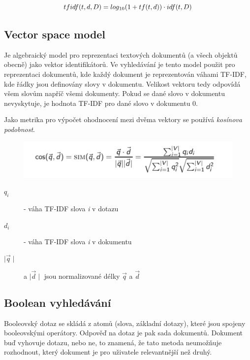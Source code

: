 \documentclass[12pt, a4paper]{article}
\begin{document}
\begin{equation}
tfidf(t,d,D) = log\textsubscript{10}(1 + tf(t,d)) \cdot idf(t,D)
\end{equation}

\subsection{Vector space model}
\noindent Je algebraický model pro reprezentaci textových dokumentů (a všech objektů obecně) jako vektor identifikátorů. Ve vyhledávání je tento model použit pro reprezentaci dokumentů, kde každý dokument je reprezentován váhami TF-IDF, kde řádky jsou definovány slovy v dokumentu. Velikost vektoru tedy odpovídá všem slovům napříč všemi dokumenty. Pokud se dané slovo v dokumentu nevyskytuje, je hodnota TF-IDF pro dané slovo v dokumentu 0.

Jako metrika pro výpočet ohodnocení mezi dvěma vektory se používá \textit{kosínova podobnost}.

\begin{figure}[H]
  \centering
  \includegraphics[scale=0.3]{img/cosine.png}
  \label{struktura}
\end{figure}

\begin{description}

	\item [$q_i$] - váha TF-IDF slova \textit{i} v dotazu
	\item [$d_i$] - váha TF-IDF slova \textit{i} v dokumentu
	\item [$\mid \overrightarrow{q} \mid$] a $\mid \overrightarrow{d} \mid$ jsou normalizované délky $\overrightarrow{q}$ a $\overrightarrow{d}$
\end{description}


\subsection{Boolean vyhledávání}
\noindent Booleovský dotaz se skládá z atomů (slova, základní dotazy), které jsou spojeny booleovskými operátory. Odpověď na dotaz je pak sada dokumentů. Dokument buď vyhovuje dotazu, nebo ne, to znamená, že tato metoda neumožňuje rozhodnout, který dokument je pro uživatele relevantnější než druhý.
\end{document}
